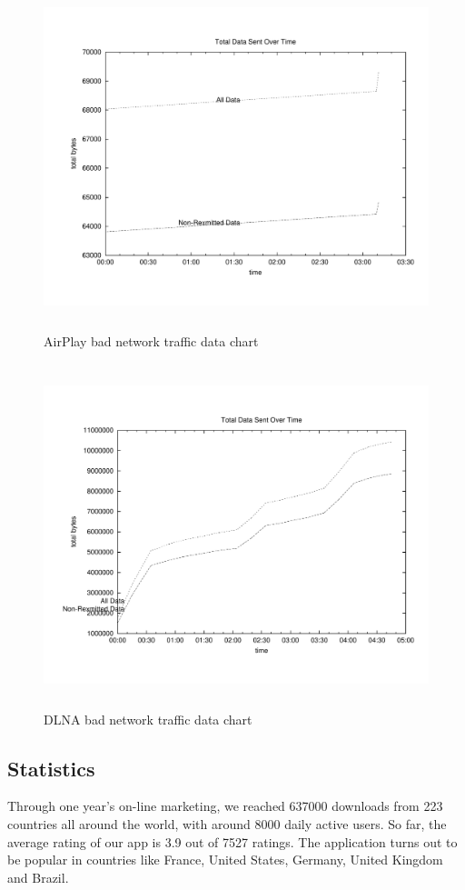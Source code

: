\begin{figure}[htb]
\centering \includegraphics[height=10cm]{charts/airplay_traffic_15loss_data}
\caption{AirPlay bad network traffic data chart \label{chart6}}
\end{figure}
\begin{figure}[htb]
\centering \includegraphics[height=10cm]{charts/dlna_traffic_15loss_data}
\caption{DLNA bad network traffic data chart \label{chart6}}
\end{figure}

\subsection{Statistics}
Through one year's on-line marketing, we reached 637000 downloads from 223
countries all around the world, with around 8000 daily active users. So far, the
average rating of our app is 3.9 out of 7527 ratings. The application turns out
to be popular in countries like France, United States, Germany, United Kingdom
and Brazil.

